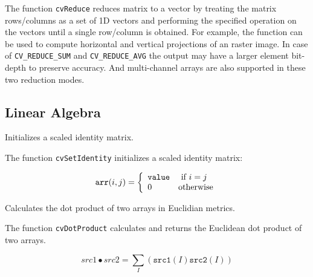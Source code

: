The function \texttt{cvReduce} reduces matrix to a vector by treating the matrix rows/columns as a set of 1D vectors and performing the specified operation on the vectors until a single row/column is obtained. For example, the function can be used to compute horizontal and vertical projections of an raster image. In case of \texttt{CV\_REDUCE\_SUM} and \texttt{CV\_REDUCE\_AVG} the output may have a larger element bit-depth to preserve accuracy. And multi-channel arrays are also supported in these two reduction modes. 


\subsection{Linear Algebra}

\label{SetIdentity}

Initializes a scaled identity matrix.


\begin{description}
\end{description}

The function \texttt{cvSetIdentity} initializes a scaled identity matrix:

\[
\texttt{arr}(i,j)=\left\{ \begin{array}{l l} \texttt{value} & \mbox{ if $i=j$}\\ 0 & \mbox{otherwise}\\ \end{array} \right.
\]

\label{DotProduct}

Calculates the dot product of two arrays in Euclidian metrics.


\begin{description}
\end{description}

The function \texttt{cvDotProduct} calculates and returns the Euclidean dot product of two arrays.

\[
src1 \bullet src2 = \sum_I (\texttt{src1}(I) \texttt{src2}(I))
\]

